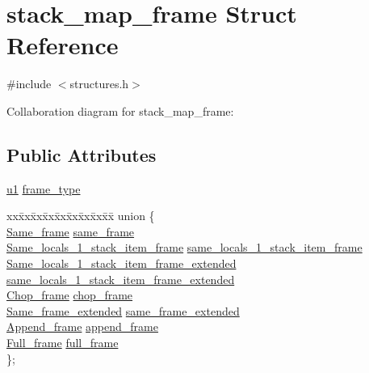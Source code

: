 \hypertarget{structstack__map__frame}{}\section{stack\+\_\+map\+\_\+frame Struct Reference}
\label{structstack__map__frame}


{\ttfamily \#include $<$structures.\+h$>$}



Collaboration diagram for stack\+\_\+map\+\_\+frame\+:
\subsection*{Public Attributes}
\begin{DoxyCompactItemize}
\item 
\hyperlink{structures_8h_a64f8055b64cf2a4c299c841130c5c938}{u1} \hyperlink{structstack__map__frame_ae7d53e0f8daea6d5738a88ffb94e575c}{frame\+\_\+type}
\item 
\begin{tabbing}
xx\=xx\=xx\=xx\=xx\=xx\=xx\=xx\=xx\=\kill
union \{\\
\>\hyperlink{structSame__frame}{Same\_frame} \hyperlink{structstack__map__frame_a566369b2c76e233dc18856709be7d3dc}{same\_frame}\\
\>\hyperlink{structSame__locals__1__stack__item__frame}{Same\_locals\_1\_stack\_item\_frame} \hyperlink{structstack__map__frame_a4a73bdea158110c9c632ef657acdceed}{same\_locals\_1\_stack\_item\_frame}\\
\>\hyperlink{structSame__locals__1__stack__item__frame__extended}{Same\_locals\_1\_stack\_item\_frame\_extended} \hyperlink{structstack__map__frame_acb0262b85b6ddf629227b4e269107c4d}{same\_locals\_1\_stack\_item\_frame\_extended}\\
\>\hyperlink{structChop__frame}{Chop\_frame} \hyperlink{structstack__map__frame_a5240372d8b1af1775ee49050a515b9f2}{chop\_frame}\\
\>\hyperlink{structSame__frame__extended}{Same\_frame\_extended} \hyperlink{structstack__map__frame_a5fd4fb1c466520e7296b33ca512a844a}{same\_frame\_extended}\\
\>\hyperlink{structAppend__frame}{Append\_frame} \hyperlink{structstack__map__frame_ab412797c19922cdc0ac8fee59c59b49b}{append\_frame}\\
\>\hyperlink{structFull__frame}{Full\_frame} \hyperlink{structstack__map__frame_a6f51b3460b916cc6285c57efa37bf8e0}{full\_frame}\\
\}; \\

\end{tabbing}\end{DoxyCompactItemize}


